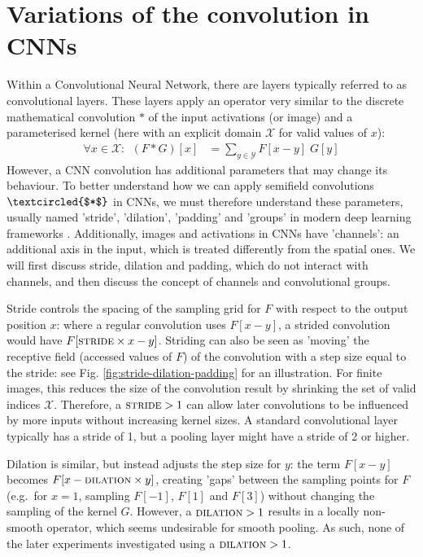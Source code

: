 \documentclass[a4paper, 12pt]{report}
\begin{document}
\section{Variations of the convolution in CNNs}
Within a Convolutional Neural Network, there are layers typically referred to as convolutional layers. These layers apply an operator very similar to the discrete mathematical convolution $*$ of the input activations (or image) and a parameterised kernel (here with an explicit domain $\mathcal{X}$ for valid values of $x$):
\begin{align}
\forall x\in\mathcal{X}:~~(F*G)[x] &= \sum_{y\in\mathcal{Y}} F[x-y]\; G[y]
\end{align}
However, a CNN convolution has additional parameters that may change its behaviour. To better understand how we can apply semifield convolutions $\textcircled{$*$}$ in CNNs, we must therefore understand these parameters, usually named 'stride', 'dilation', 'padding'  and 'groups' in modern deep learning frameworks \cite{noauthor_conv2d_nodate, noauthor_xla_nodate}. Additionally, images and activations in CNNs have 'channels': an additional axis in the input, which is treated differently from the spatial ones. We will first discuss stride, dilation and padding, which do not interact with channels, and then discuss the concept of channels and convolutional groups.

Stride controls the spacing of the sampling grid for $F$ with respect to the output position $x$: where a regular convolution uses $F[x-y]$, a strided convolution would have $F[\textsc{stride}\times x - y]$. Striding can also be seen as 'moving' the receptive field (accessed values of $F$) of the convolution with a step size equal to the stride: see Fig. \ref{fig:stride-dilation-padding} for an illustration. For finite images, this reduces the size of the convolution result by shrinking the set of valid indices $\mathcal{X}$. Therefore, a $\textsc{stride}>1$ can allow later convolutions to be influenced by more inputs without increasing kernel sizes. A standard convolutional layer typically has a stride of 1, but a pooling layer might have a stride of 2 or higher.

Dilation is similar, but instead adjusts the step size for $y$: the term $F[x-y]$ becomes $F[x-\textsc{dilation}\times y]$, creating 'gaps' between the sampling points for $F$ (e.g.\ for $x=1$, sampling $F[-1]$, $F[1]$ and $F[3]$) without changing the sampling of the kernel $G$. However, a $\textsc{dilation}>1$ results in a locally non-smooth operator, which seems undesirable for smooth pooling. As such, none of the later experiments investigated using a $\textsc{dilation}>1$.
\end{document}
